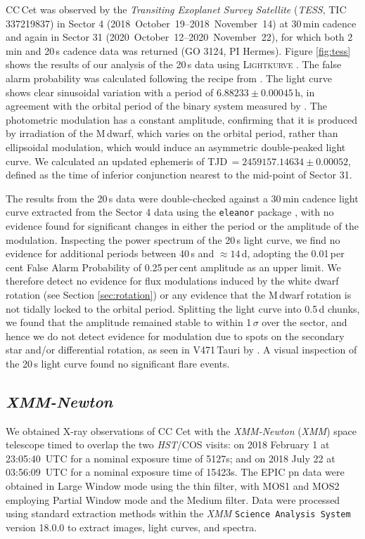 \documentclass[fleqn,usenatbib]{mnras}
\begin{document}
CC\,Cet was observed by the \textit{Transiting Exoplanet Survey Satellite} (\textit{TESS}, TIC 337219837) in Sector 4 (2018~October~19--2018~November~14) at 30\,min cadence and again in Sector 31 (2020~October~12--2020~November~22), for which both  2\,min and 20\,s cadence data was returned (GO 3124, PI Hermes). Figure \ref{fig:tess} shows the results of our analysis of the 20\,s data using \textsc{Lightkurve} . The false alarm probability was calculated following the recipe from \citet{belletal19-1}. The light curve shows clear sinusoidal variation with a period of $6.88233\pm0.00045$\,h, in agreement with the orbital period of the binary system measured by \citet{somersetal96-2}. The photometric modulation has a constant amplitude, confirming that it is produced by irradiation of the M\,dwarf, which varies on the orbital period, rather than ellipsoidal modulation, which would induce an asymmetric double-peaked light curve. We calculated an updated ephemeris of TJD\,$=2459157.14634\pm0.00052$, defined as the time of inferior conjunction nearest to the mid-point of Sector 31.  

The results from the 20\,s data were double-checked against a 30\,min cadence light curve extracted from the Sector 4 data using the \texttt{eleanor} package \citep{feinsteinetal19-1}, with no evidence found for significant changes in either the
period or the amplitude of the modulation. Inspecting the power spectrum of the 20\,s light curve, we find no evidence for additional periods between 40\,s and $\approx14$\,d, adopting the 0.01\,per\,cent False Alarm Probability of 0.25\,per\,cent amplitude as an upper limit. We therefore detect no evidence for flux modulations induced by the white dwarf rotation (see Section \ref{sec:rotation}) or any evidence that the M\,dwarf rotation is not tidally locked to the orbital period. Splitting the light curve into  0.5\,d chunks, we found that the amplitude remained stable to within 1\,$\sigma$ over the sector, and hence we do not detect evidence for modulation due to spots on the secondary star and/or differential rotation, as seen in V471\,Tauri by \citet{kovarietal21-1}. A visual inspection of the 20\,s light curve found no significant flare events.  

\subsection{\textit{XMM-Newton}}

We obtained X-ray observations of CC Cet with the {\em XMM-Newton} (\textit{XMM}) space telescope timed to overlap the two \textit{HST}/COS visits: on 2018 February 1 at 23:05:40~UTC for a nominal exposure time of 5127s; and on 2018 July 22 at 03:56:09~UTC for a nominal exposure time of 15423s. The EPIC pn data were obtained in Large Window mode using the thin filter, with MOS1 and MOS2 employing Partial Window mode and the Medium filter. Data were processed using standard extraction methods within the \textit{XMM} {\tt Science Analysis System} version 18.0.0 to extract images, light curves, and spectra.  
\end{document}
